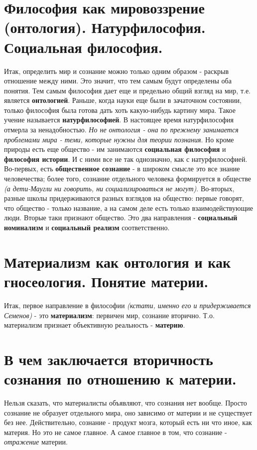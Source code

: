 \documentclass[12pt,a4paper]{article}
\begin{document}
\section{Философия как мировоззрение (онтология). Натурфилософия. Социальная философия.}
Итак, определить мир и сознание можно только одним образом - раскрыв отношение между ними. Это значит, что тем самым будут определены оба понятия. Тем самым философия дает еще и предельно общий взгляд на мир, т.е. является \textbf{онтологией}. Раньше, когда науки еще были в зачаточном состоянии, только философия была готова дать хоть какую-нибудь картину мира. Такое учение называется \textbf{натурфилософией}. В настоящее время натурфилософия отмерла за ненадобностью. \textit{Но не онтология - она по прежнему занимается проблемами мира - теми, которые нужны для теории познания}. Но кроме природы есть еще общество - им занимаются \textbf{социальная философия} и \textbf{философия истории}. И с ними все не так однозначно, как с натурфилософией. Во-первых, есть \textbf{общественное сознание} - в широком смысле это все знание человечества; более того, сознание отдельного человека формируется в обществе \textit{(а дети-Маугли ни говорить, ни социализироваться не могут)}. Во-вторых, разные школы придерживаются разных взглядов на общество: первые говорят, что общество - только название, а на самом деле есть только взаимодействующие люди. Вторые таки признают общество. Это два направления - \textbf{социальный номинализм} и \textbf{социальный реализм} соответственно.

\section{Материализм как онтология и как гносеология. Понятие материи.}
Итак, первое направление в философии \textit{(кстати, именно его и придерживается Семенов)} - это \textbf{материализм}: первичен мир, сознание вторично. Т.о. материализм признает объективную реальность - \textbf{материю}.

\section{В чем заключается вторичность сознания по отношению к материи.}
Нельзя сказать, что материалисты объявляют, что сознания нет вообще. Просто сознание не образует отдельного мира, оно зависимо от материи и не существует без нее. Действительно, сознание - продукт мозга, который есть ни что иное, как материя. Но это не самое главное. А самое главное в том, что сознание - \textsl{отражение} материи.
\end{document}
